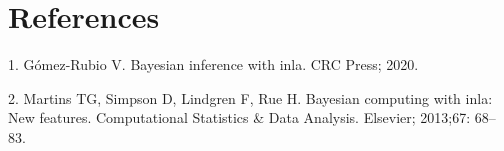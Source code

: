 \documentclass[10pt,letterpaper]{article}
\begin{document}
\hypertarget{references}{%
\section*{References}\label{references}}

\hypertarget{refs}{}
\leavevmode\hypertarget{ref-gomez2020bayesian}{}%
1. Gómez-Rubio V. Bayesian inference with inla. CRC Press; 2020.

\leavevmode\hypertarget{ref-martins2013bayesian}{}%
2. Martins TG, Simpson D, Lindgren F, Rue H. Bayesian computing with
inla: New features. Computational Statistics \& Data Analysis. Elsevier;
2013;67: 68--83.

\nolinenumbers
\end{document}
